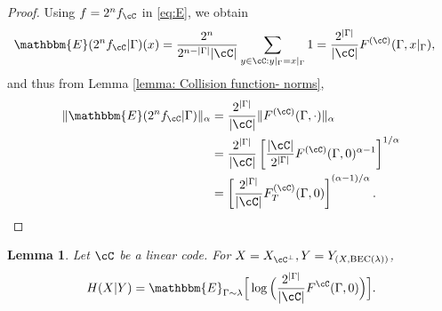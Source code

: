 \documentclass{amsart}
\newtheorem{lemma}[theorem]{Lemma}
\theoremstyle{remark}
\begin{document}
\begin{proof}
Using $f = 2^nf_{\cC}$ in \eqref{eq:E}, we obtain
\begin{align*}
    \mathbbm{E}(2^nf_{\cC}|\Gamma)(x) &= \frac{2^n}{2^{n- |\Gamma|}|\cC|} \sum_{y\in \cC : y|_\Gamma = x|_\Gamma} 1=  \frac{2^{|\Gamma|}}{|\cC|} F^{(\cC)}(\Gamma,x|_\Gamma),
\end{align*} 
and thus from Lemma \ref{lemma: Collision function- norms},
 \begin{align*}
        \|\mathbbm{E}(2^nf_{\cC}|\Gamma)\|_{\alpha}  &= \frac{2^{|\Gamma|}}{|\cC|}\|F^{(\cC)}(\Gamma,\cdot)\|_{\alpha} \\
        &= \frac{2^{|\Gamma|}}{|\cC|} \left[ \frac{|\cC|}{2^{|\Gamma|}} F^{(\cC)}(\Gamma,0)^{\alpha -1} \right]^{1/{\alpha} } \\
         &=  \left[ \frac{2^{|\Gamma|}}{|\cC|} F^{(\cC)}_T(\Gamma,0) \right]^{(\alpha -1)/{\alpha} }.
\end{align*}   
\end{proof}

\begin{lemma}\label{lemma: Collision function - RHS of 3.4}
    Let $\cC$ be a linear code. For $X = X_{\cC^{\bot}}, Y = Y_{(X,{\text{\rm BEC}}(\lambda))}$,
    \begin{align}\label{eq:HXY}
        H(X|Y) = \mathbbm{E}_{\Gamma\sim \lambda}\Big[\log \Big(\frac{2^{|\Gamma|}}{{|\cC|}} F^{\cC}(\Gamma,0)\Big) \Big].
    \end{align}  
\end{lemma}
\end{document}
